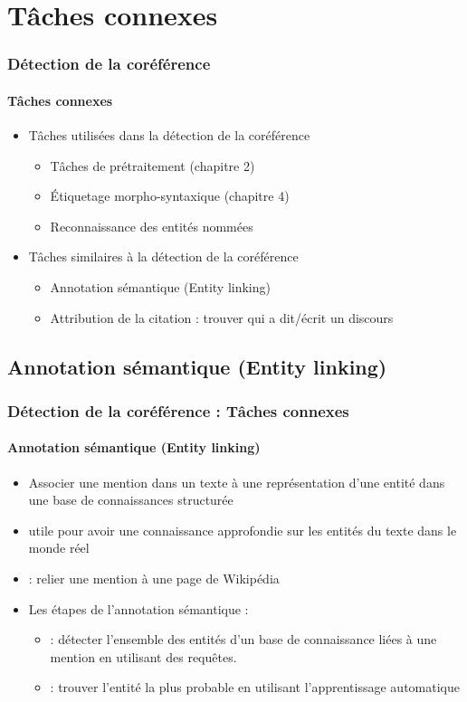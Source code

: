 \documentclass[xcolor=table]{beamer}
\begin{document}
\section{Tâches connexes}

\begin{frame}
	\frametitle{Détection de la coréférence}
	\framesubtitle{Tâches connexes}
	
	\begin{itemize}
		\item Tâches utilisées dans la détection de la coréférence
		\begin{itemize}
			\item Tâches de prétraitement (chapitre 2)
			\item Étiquetage morpho-syntaxique (chapitre 4)
			\item Reconnaissance des entités nommées
		\end{itemize}
		\item Tâches similaires à la détection de la coréférence
		\begin{itemize}
			\item Annotation sémantique (Entity linking)
			\item Attribution de la citation : trouver qui a dit/écrit un discours
		\end{itemize}
	\end{itemize}
	
\end{frame}

\subsection{Annotation sémantique (Entity linking)}

\begin{frame}
	\frametitle{Détection de la coréférence : Tâches connexes}
	\framesubtitle{Annotation sémantique (Entity linking)}
	
	\begin{itemize}
		\item Associer une mention dans un texte à une représentation d'une entité dans une base de connaissances structurée
		\item utile pour avoir une connaissance approfondie sur les entités du texte dans le monde réel
		\item {} : relier une mention à une page de Wikipédia
		\item Les étapes de l'annotation sémantique : 
		\begin{itemize}
			\item {} : détecter l'ensemble des entités d'un base de connaissance liées à une mention en utilisant des requêtes.
			\item {} : trouver l'entité la plus probable en utilisant l'apprentissage automatique
		\end{itemize}
	\end{itemize}
	
\end{frame}
\end{document}
